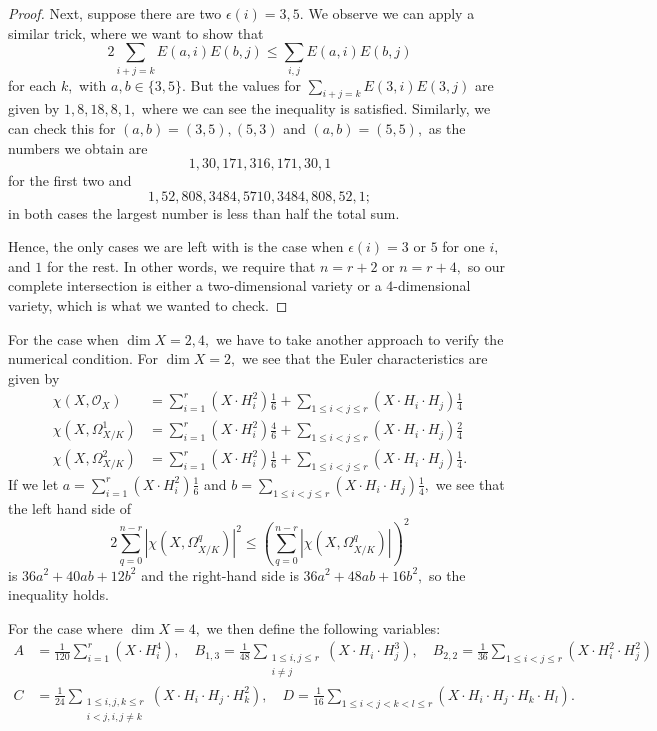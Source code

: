 \documentclass{article}
\theoremstyle{definition}
\theoremstyle{remark}
\begin{document}
\begin{proof}
\par Next, suppose there are two $\epsilon(i) = 3, 5.$ We observe we can apply a similar trick, where we want to show that $$2 \sum\limits_{i+j = k} E(a, i)E(b, j) \leq \sum\limits_{i, j} E(a, i)E(b, j)$$ for each $k,$ with $a, b \in \{3, 5\}.$ But the values for $\sum\limits_{i+j = k} E(3, i)E(3, j)$ are given by $1, 8, 18, 8, 1,$ where we can see the inequality is satisfied. Similarly, we can check this for $(a, b) = (3, 5), (5, 3)$ and $(a, b) = (5, 5),$ as the numbers we obtain are $$1, 30, 171, 316, 171, 30, 1$$ for the first two and $$1, 52, 808, 3484, 5710, 3484, 808, 52, 1;$$ in both cases the largest number is less than half the total sum. 
\par Hence, the only cases we are left with is the case when $\epsilon(i) = 3$ or $5$ for one $i,$ and $1$ for the rest. In other words, we require that $n = r + 2$ or $n = r + 4,$ so our complete intersection is either a two-dimensional variety or a $4$-dimensional variety, which is what we wanted to check.
\end{proof}
For the case when $\dim X = 2, 4,$ we have to take another approach to verify the numerical condition. For $\dim X = 2,$ we see that the Euler characteristics are given by \begin{align*}\chi(X, \mathcal{O}_X) & = \sum\limits_{i = 1}^r (X \cdot H_i^2) \frac{1}{6} + \sum\limits_{1 \leq i < j \leq r} (X \cdot H_i \cdot H_j) \frac{1}{4} \\ \chi(X, \Omega^1_{X/K}) & = \sum\limits_{i = 1}^r (X \cdot H_i^2) \frac{4}{6} + \sum\limits_{1 \leq i < j \leq r} (X \cdot H_i \cdot H_j) \frac{2}{4} \\ \chi(X, \Omega^2_{X/K}) & = \sum\limits_{i = 1}^r (X \cdot H_i^2) \frac{1}{6} + \sum\limits_{1 \leq i < j \leq r} (X \cdot H_i \cdot H_j) \frac{1}{4}.\end{align*} If we let $a = \sum\limits_{i = 1}^r (X \cdot H_i^2) \frac{1}{6}$ and $b = \sum\limits_{1 \leq i < j \leq r} (X \cdot H_i \cdot H_j) \frac{1}{4},$ we see that the left hand side of \[2\sum\limits_{q=0}^{n-r} |\chi(X, \Omega^q_{X/K})|^2 \leq (\sum\limits_{q=0}^{n-r} |\chi(X, \Omega^q_{X/K})|)^2\] is $36a^2 + 40ab + 12b^2$ and the right-hand side is $36a^2 + 48ab + 16b^2,$ so the inequality holds.
\par For the case where $\dim X = 4,$ we then define the following variables: \begin{align*}
A & = \frac{1}{120}\sum\limits_{i=1}^r (X \cdot H_i^4), \quad B_{1, 3}  = \frac{1}{48}\sum\limits_{\substack{1 \leq i, j \leq r \\ i \neq j}} (X \cdot H_i \cdot H_j^3), \quad B_{2, 2} = \frac{1}{36}\sum\limits_{1 \leq i < j \leq r} (X \cdot H_i^2 \cdot H_j^2)  \\ C & = \frac{1}{24}\sum\limits_{\substack{1 \leq i, j, k \leq r \\ i < j, i, j \neq k}} (X \cdot H_i \cdot H_j \cdot H_k^2), \quad D = \frac{1}{16}\sum\limits_{1 \leq i < j < k < l \leq r} (X \cdot H_i \cdot H_j \cdot H_k \cdot H_l).
\end{align*}
\end{document}
